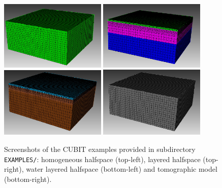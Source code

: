 \begin{figure}[htbp]
\noindent \begin{centering}
\includegraphics[width=0.45\textwidth]{figures/example-homogeneous.jpg}
\includegraphics[width=0.45\textwidth]{figures/example-2layers.jpg} \\
\includegraphics[width=0.45\textwidth]{figures/example-water.jpg}
\includegraphics[width=0.45\textwidth]{figures/example-tomo.jpg}
\par\end{centering}

\caption{Screenshots of the CUBIT examples provided in subdirectory \texttt{EXAMPLES/}:
homogeneous halfspace (top-left), layered halfspace (top-right), water
layered halfspace (bottom-left) and tomographic model (bottom-right).}


\label{fig:examples.cubit}
\end{figure}


